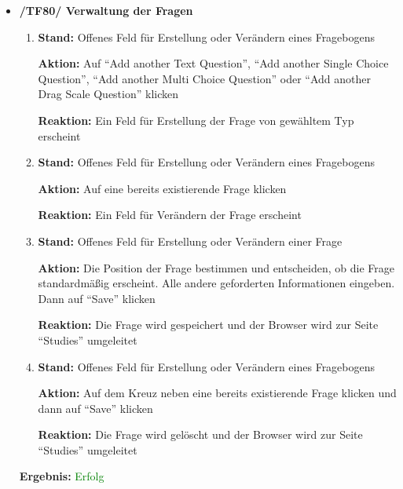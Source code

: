 \documentclass[a4paper]{scrreprt}
\begin{document}
\begin{itemize}
		                      \item \textbf{/TF80/ Verwaltung der Fragen}
		                              \begin{enumerate}
		                              \item \par \textbf{Stand: }Offenes Feld f\"ur Erstellung oder Ver\"andern eines Fragebogens
		                                    \par \textbf{Aktion: }Auf ``Add another Text Question'', ``Add another Single Choice Question'', ``Add another Multi Choice Question'' oder ``Add another Drag Scale Question'' klicken
		                                    \par \textbf{Reaktion: }Ein Feld f\"ur Erstellung der Frage von gew\"ahltem Typ erscheint         
		                              \item \par \textbf{Stand: }Offenes Feld f\"ur Erstellung oder Ver\"andern eines Fragebogens
		                                    \par \textbf{Aktion: }Auf eine bereits existierende Frage klicken
		                                    \par \textbf{Reaktion: }Ein Feld f\"ur Ver\"andern der Frage erscheint                                                     
		                              \item \par \textbf{Stand: }Offenes Feld f\"ur Erstellung oder Ver\"andern einer Frage
		                                    \par \textbf{Aktion: }Die Position der Frage bestimmen und entscheiden, ob die Frage standardm\"aßig erscheint. Alle andere geforderten Informationen eingeben. Dann auf ``Save'' klicken
		                                    \par \textbf{Reaktion: }Die Frage wird gespeichert und der Browser wird zur Seite ``Studies'' umgeleitet    
		                              \item \par \textbf{Stand: }Offenes Feld f\"ur Erstellung oder Ver\"andern eines Fragebogens
		                                    \par \textbf{Aktion: }Auf dem Kreuz neben eine bereits existierende Frage klicken und dann auf ``Save'' klicken
		                                    \par \textbf{Reaktion: }Die Frage wird gel\"oscht und der Browser wird zur Seite ``Studies'' umgeleitet
		                          \end{enumerate}
		      					\vspace*{0.3cm}
		      		           \par \textbf{Ergebnis: }\textcolor{green}{Erfolg}
		      		           \vspace*{0.6cm} 
		      

\end{itemize}
\end{document}
